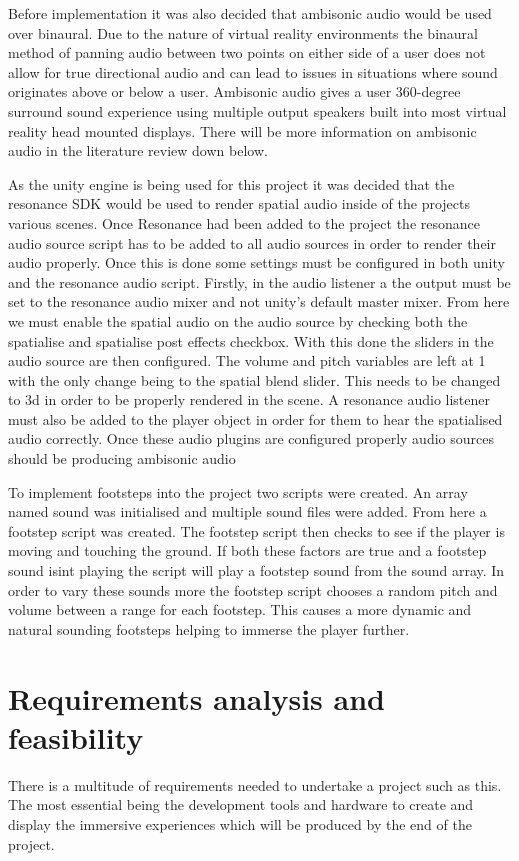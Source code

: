 Before implementation it was also decided that ambisonic audio would be used over binaural. Due to the nature of virtual reality environments the binaural method of panning audio between two points on either side of a user does not allow for true directional audio and can lead to issues in situations where sound originates above or below a user. Ambisonic audio gives a user 360-degree surround sound experience using multiple output speakers built into most virtual reality head mounted displays. There will be more information on ambisonic audio in the literature review down below.

 As the unity engine is being used for this project it was decided that the resonance SDK would be used to render spatial audio inside of the projects various scenes. Once Resonance had been added to the project the resonance audio source script has to be added to all audio sources in order to render their audio properly. Once this is done some settings must be configured in both unity and the resonance audio script. Firstly, in the audio listener a the output must be set to the resonance audio mixer and not unity’s default master mixer. From here we must enable the spatial audio on the audio source by checking both the spatialise and spatialise post effects checkbox. With this done the sliders in the audio source are then configured. The volume and pitch variables are left at 1 with the only change being to the spatial blend slider. This needs to be changed to 3d in order to be properly rendered in the scene. A resonance audio listener must also be added to the player object in order for them to hear the spatialised audio correctly. Once these audio plugins are configured properly audio sources should be producing ambisonic audio

To implement footsteps into the project two scripts were created. An array named sound was initialised and multiple sound files were added. From here a footstep script was created. The footstep script then checks to see if the player is moving and touching the ground. If both these factors are true and a footstep sound isint playing the script will play a footstep sound from the sound array. In order to vary these sounds more the footstep script chooses a random pitch and volume between a range for each footstep. This causes a more dynamic and natural sounding footsteps helping to immerse the player further.

\chapter{Requirements analysis and feasibility}
There is a multitude of requirements needed to undertake a project such as this. The most essential being the development tools and hardware to create and display the immersive experiences which will be produced by the end of the project.  
 

